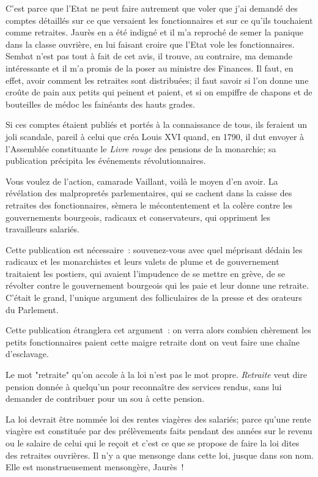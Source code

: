 \documentclass[french,twoside]{book} %
\begin{document}
C'est parce que l’Etat ne peut faire autrement que voler que j’ai demandé des comptes détaillés sur ce que versaient les fonctionnaires et sur ce qu’ils touchaient comme retraites. Jaurès en a été indigné et il m’a reproché de semer la panique dans la classe ouvrière, en lui faisant croire que l’Etat vole les fonctionnaires. Sembat n’est pas tout à fait de cet avis, il trouve, au contraire, ma demande intéressante et il m’a promis de la poser au ministre des Finances. Il faut, en effet, avoir comment les retraites sont distribuées; il faut savoir si l’on donne une croûte de pain aux petits qui peinent et paient, et si on empiffre de chapons et de bouteilles de médoc les fainéants des hauts grades.\par
Si ces comptes étaient publiés et portés à la connaissance de tous, ils feraient un joli scandale, pareil à celui que créa Louis XVI quand, en 1790, il dut envoyer à l’Assemblée constituante le \emph{Livre rouge} des pensions de la monarchie; sa publication précipita les événements révolutionnaires.\par
Vous voulez de l’action, camarade Vaillant, voilà le moyen d’en avoir. La révélation des malpropretés parlementaires, qui se cachent dans la caisse des retraites des fonctionnaires, sèmera le mécontentement et la colère contre les gouvernements bourgeois, radicaux et conservateurs, qui oppriment les travailleurs salariés.\par
Cette publication est nécessaire : souvenez-vous avec quel méprisant dédain les radicaux et les monarchistes et leurs valets de plume et de gouvernement traitaient les postiers, qui avaient l’impudence de se mettre en grève, de se révolter contre le gouvernement bourgeois qui les paie et leur donne une retraite. C'était le grand, l’unique argument des folliculaires de la presse et des orateurs du Parlement.\par
Cette publication étranglera cet argument : on verra alors combien chèrement les petits fonctionnaires paient cette maigre retraite dont on veut faire une chaîne d’esclavage.\par
Le mot "retraite" qu’on accole à la loi n’est pas le mot propre. \emph{Retraite} veut dire pension donnée à quelqu’un pour reconnaître des services rendus, sans lui demander de contribuer pour un sou à cette pension.\par
La loi devrait être nommée loi des rentes viagères des salariés; parce qu’une rente viagère est constituée par des prélèvements faits pendant des années sur le revenu ou le salaire de celui qui le reçoit et c’est ce que se propose de faire la loi dites des retraites ouvrières. Il n’y a que mensonge dans cette loi, jusque dans son nom. Elle est monstrueusement mensongère, Jaurès !\par
\end{document}
